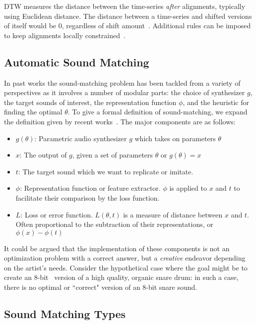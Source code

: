 \documentclass[lettersize,journal]{IEEEtran}
\begin{document}
DTW measures the distance between the time-series \textit{after} alignments, typically using Euclidean distance. The distance between a time-series and shifted versions of itself would be 0, regardless of shift amount~\cite{tavenard.blog.dtw}. Additional rules can be imposed to keep alignments locally constrained~\cite{itakura1975minimum,sakoe1978dynamic}.

\subsection{Automatic Sound Matching}
\label{sec:sound_matching_definition}
In past works the sound-matching problem has been tackled from a variety of perspectives as it involves a number of modular parts: the choice of synthesizer $g$, the target sounds of interest, the representation function $\phi$, and the heuristic for finding the optimal $\theta$. To give a formal definition of sound-matching, we expand the definition given by recent works~\cite{vahidi2023mesostructures,han2023perceptual}. The major components are as follows: 
\begin{itemize}
    \item $g(\theta)$: Parametric audio synthesizer $g$ which takes on parameters $\theta$ 
    \item $x$: The output of $g$, given a set of parameters $\theta$ or $g(\theta) = x$ 
    \item $t$: The target sound which we want to replicate or imitate. 
    \item $\phi$: Representation function or feature extractor. $\phi$ is applied to $x$ and $t$ to facilitate their comparison by the loss function.
    \item $L$: Loss or error function. $L(\theta,t)$ is a measure of distance between $x$ and $t$. Often proportional to the subtraction of their representations, or $ \phi(x) - \phi(t)$
\end{itemize}

It could be argued that the implementation of these components is not an optimization problem with a correct answer, but a \textit{creative} endeavor depending on the artist's needs. Consider the hypothetical case where the goal might be to create an 8-bit~\cite{collins2007loop} version of a high quality, organic snare drum: in such a case, there is no optimal or ``correct" version of an 8-bit snare sound. 

\subsection{Sound Matching Types}
\label{sec:matching_types}
\end{document}
